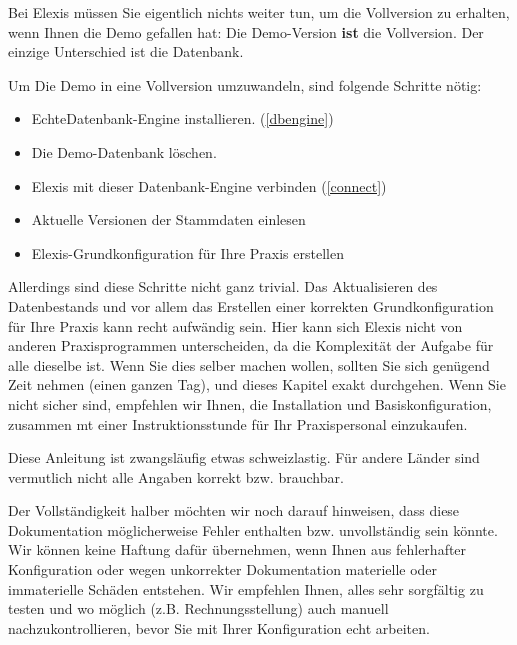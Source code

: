 
\label{vollversion}
Bei Elexis müssen Sie eigentlich nichts weiter tun, um die Vollversion zu
erhalten, wenn Ihnen die Demo gefallen hat: Die Demo-Version \textbf{ist} die
Vollversion. Der einzige Unterschied ist die Datenbank.

Um Die Demo in eine Vollversion umzuwandeln, sind folgende Schritte nötig:
\begin{itemize}
  \item \glqq Echte\grqq{}Datenbank-Engine installieren. (\ref{dbengine})
  \item Die Demo-Datenbank löschen.
  \item Elexis mit dieser Datenbank-Engine verbinden (\ref{connect})
  \item Aktuelle Versionen der Stammdaten einlesen
  \item Elexis-Grundkonfiguration für Ihre Praxis erstellen
\end{itemize}
Allerdings sind diese Schritte nicht ganz trivial. Das Aktualisieren des
Datenbestands und vor allem das Erstellen einer korrekten Grundkonfiguration für
Ihre Praxis kann recht aufwändig sein. Hier kann sich Elexis nicht von anderen
Praxisprogrammen unterscheiden, da die Komplexität der Aufgabe für alle dieselbe
ist.
Wenn Sie dies selber machen wollen, sollten Sie sich genügend Zeit nehmen (einen
ganzen Tag), und dieses Kapitel exakt durchgehen. Wenn Sie nicht sicher sind,
empfehlen wir Ihnen, die Installation und Basiskonfiguration, zusammen mt einer
Instruktionsstunde für Ihr Praxispersonal einzukaufen.\par
Diese Anleitung ist zwangsläufig etwas schweizlastig. Für andere Länder sind vermutlich nicht alle Angaben korrekt bzw. brauchbar.
\bigskip

Der Vollständigkeit halber möchten wir noch darauf hinweisen, dass diese Dokumentation möglicherweise Fehler enthalten bzw. unvollständig sein könnte. Wir können keine Haftung dafür übernehmen, wenn Ihnen aus fehlerhafter Konfiguration oder wegen unkorrekter Dokumentation materielle oder immaterielle Schäden entstehen. Wir empfehlen Ihnen, alles sehr sorgfältig zu testen und wo möglich (z.B. Rechnungsstellung) auch manuell nachzukontrollieren, bevor Sie mit Ihrer Konfiguration \glqq echt\grqq{} arbeiten.
